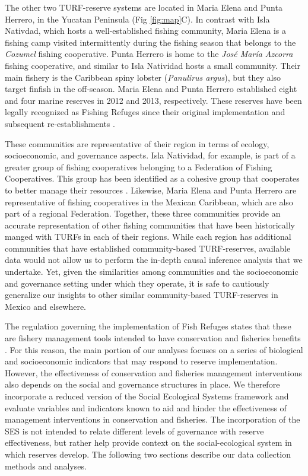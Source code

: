 \documentclass{frontiersSCNS}
\begin{document}
The other two TURF-reserve systems are located in Maria Elena and Punta Herrero, in the Yucatan Peninsula (Fig \ref{fig:map}C). In contrast with Isla Nativdad, which hosts a well-established fishing community, Maria Elena is a fishing camp visited intermittently during the fishing season that belongs to the \emph{Cozumel} fishing cooperative. Punta Herrero is home to the \emph{José María Azcorra} fishing cooperative, and similar to Isla Natividad hosts a small community. Their main fishery is the Caribbean spiny lobster (\emph{Panulirus argus}), but they also target finfish in the off-season. Maria Elena and Punta Herrero established eight and four marine reserves in 2012 and 2013, respectively. These reserves have been legally recognized as Fishing Refuges since their original implementation \citep{dof_website_2012,dof_website_2013} and subsequent re-establishments \citep{dof_website_2017b}.

These communities are representative of their region in terms of ecology, socioeconomic, and governance aspects. Isla Natividad, for example, is part of a greater group of fishing cooperatives belonging to a Federation of Fishing Cooperatives. This group has been identified as a cohesive group that cooperates to better manage their resources \citep{mccay_2014,mccay_2017,acevesbueno_2017}. Likewise, Maria Elena and Punta Herrero are representative of fishing cooperatives in the Mexican Caribbean, which are also part of a regional Federation. Together, these three communities provide an accurate representation of other fishing communities that have been historically manged with TURFs in each of their regions. While each region has additional communities that have established community-based TURF-reserves, available data would not allow us to perform the in-depth causal inference analysis that we undertake. Yet, given the similarities among communities and the socioeconomic and governance setting under which they operate, it is safe to cautiously generalize our insights to other similar community-based TURF-reserves in Mexico and elsewhere.

The regulation governing the implementation of Fish Refuges states that these are fishery management tools intended to have conservation and fisheries benefits \citep{nom}. For this reason, the main portion of our analyses focuses on a series of biological and socioeconomic indicators that may respond to reserve implementation. However, the effectiveness of conservation and fisheries management interventions also depends on the social and governance structures in place. We therefore incorporate a reduced version of the Social Ecological Systems framework \citep{ostrom_2009} and evaluate variables and indicators known to aid and hinder the effectiveness of management interventions in conservation and fisheries. The incorporation of the SES is not intended to relate different levels of governance with reserve effectiveness, but rather help provide context on the social-ecological system in which reserves develop. The following two sections describe our data collection methods and analyses.
\end{document}
